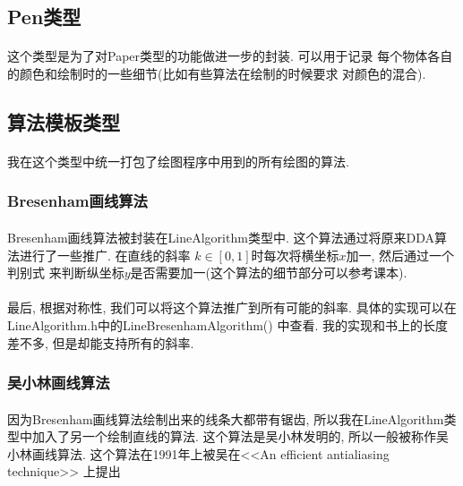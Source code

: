 \documentclass{article}
\begin{document}
	\subsection{Pen类型}
		\paragraph{}
			这个类型是为了对Paper类型的功能做进一步的封装. 可以用于记录
			每个物体各自的颜色和绘制时的一些细节(比如有些算法在绘制的时候要求
			对颜色的混合).
	\subsection{算法模板类型}
		\paragraph{}
			我在这个类型中统一打包了绘图程序中用到的所有绘图的算法.	
		\subsubsection{Bresenham画线算法}
			\paragraph{}
				Bresenham画线算法被封装在LineAlgorithm类型中.
				这个算法通过将原来DDA算法进行了一些推广. 在直线的斜率
				$k \in [0, 1]$时每次将横坐标$x$加一, 然后通过一个判别式
				来判断纵坐标$y$是否需要加一(这个算法的细节部分可以参考课本).
			\paragraph{}
				最后, 根据对称性, 我们可以将这个算法推广到所有可能的斜率.
				具体的实现可以在LineAlgorithm.h中的LineBresenhamAlgorithm()
				中查看. 我的实现和书上的长度差不多, 但是却能支持所有的斜率.
		\subsubsection{吴小林画线算法}
			\paragraph{}
				因为Bresenham画线算法绘制出来的线条大都带有锯齿, 
				所以我在LineAlgorithm类型中加入了另一个绘制直线的算法. 
				这个算法是吴小林发明的, 所以一般被称作吴小林画线算法.
				这个算法在1991年上被吴在<<An efficient antialiasing 
				technique>> 上提出
			\clearpage
\end{document}
